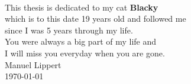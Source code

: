 \thispagestyle{empty}


\begin{center}
    \vspace*{3cm}
    \vspace{2cm}\\
    This thesis is dedicated to my cat \textbf{Blacky}\\ which is to this date 19 years old and followed me\\ since I was 5 years through my life.\\You were always a big part of my life and\\ I will miss you everyday when you are gone.\\
    \bigskip
    Manuel Lippert\\
    \today
\end{center}